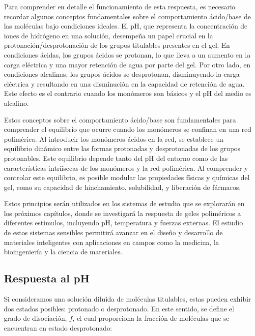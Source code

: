Para comprender en detalle el funcionamiento de esta respuesta, es necesario recordar algunos conceptos fundamentales sobre el comportamiento \'acido/base de las mol\'eculas bajo condiciones ideales. El pH, que representa la concentraci\'on de iones de hidr\'ogeno en una soluci\'on, desempe\~na un papel crucial en la protonaci\'on/desprotonaci\'on de los grupos titulables presentes en el gel. En condiciones \'acidas, los grupos \'acidos se protonan, lo que lleva a un aumento en la carga el\'ectrica y una mayor retenci\'on de agua por parte del gel. Por otro lado, en condiciones alcalinas, los grupos \'acidos se desprotonan, disminuyendo la carga el\'ectrica y resultando en una disminuci\'on en la capacidad de retenci\'on de agua. Este efecto es el contrario cuando los mon\'omeros son b\'asicos y el pH del medio es alcalino.

Estos conceptos sobre el comportamiento \'acido/base son fundamentales para comprender el equilibrio que ocurre cuando los mon\'omeros se confinan en una red polim\'erica. Al introducir los mon\'omeros \'acidos en la red, se establece un equilibrio din\'amico entre las formas protonadas y desprotonadas de los grupos protonables. Este equilibrio depende tanto del pH del entorno como de las caracter\'isticas intrí\'isecas de los mon\'omeros y la red polim\'erica. Al comprender y controlar este equilibrio, es posible modular las propiedades f\'isicas y qu\'imicas del gel, como su capacidad de hinchamiento, solubilidad, y liberaci\'on de f\'armacos.

Estos principios ser\'an utilizados en los sistemas de estudio que se explorar\'an en los pr\'oximos cap\'itulos, donde se investigar\'a la respuesta de geles polim\'ericos a diferentes est\'imulos, incluyendo pH, temperatura y fuerzas externas. El estudio de estos sistemas sensibles permitir\'a avanzar en el dise\~no y desarrollo de materiales inteligentes con aplicaciones en campos como la medicina, la bioingenier\'ia y la ciencia de materiales.


\subsection{Respuesta al pH} \label{sec:film:respuesta-pH}

Si consideramos una soluci\'on diluida de mol\'eculas titulables, estas pueden exhibir dos estados posibles: protonado o desprotonado. En este sentido, se define el grado de disociaci\'on, $f$, el cual proporciona la fracci\'on de mol\'eculas que se encuentran en estado desprotonado:

